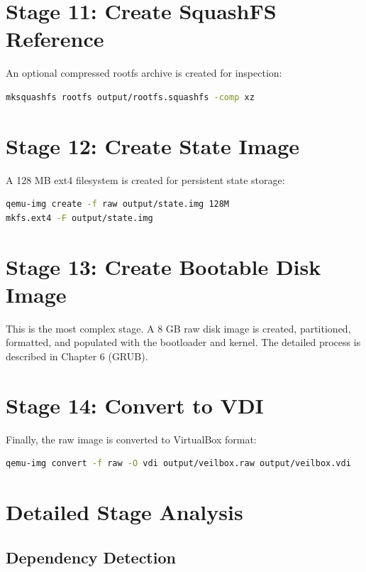 \section{Stage 11: Create SquashFS Reference}

An optional compressed rootfs archive is created for inspection:

\begin{lstlisting}[language=bash]
mksquashfs rootfs output/rootfs.squashfs -comp xz
\end{lstlisting}

\section{Stage 12: Create State Image}

A 128 MB ext4 filesystem is created for persistent state storage:

\begin{lstlisting}[language=bash]
qemu-img create -f raw output/state.img 128M
mkfs.ext4 -F output/state.img
\end{lstlisting}

\section{Stage 13: Create Bootable Disk Image}

This is the most complex stage. A 8 GB raw disk image is created,
partitioned, formatted, and populated with the bootloader and kernel.
The detailed process is described in Chapter 6 (GRUB).

\section{Stage 14: Convert to VDI}

Finally, the raw image is converted to VirtualBox format:

\begin{lstlisting}[language=bash]
qemu-img convert -f raw -O vdi output/veilbox.raw output/veilbox.vdi
\end{lstlisting}


\section{Detailed Stage Analysis}

\subsection{Dependency Detection}

